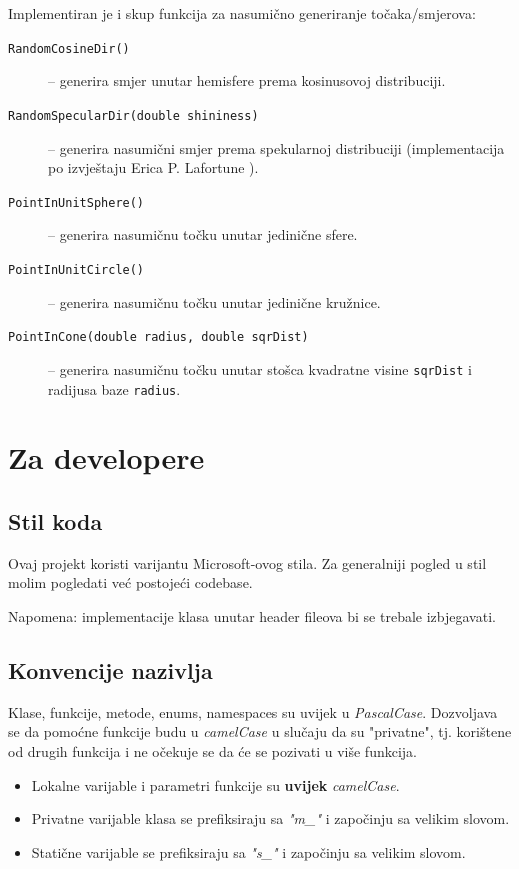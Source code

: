 \documentclass[
12pt, %
oneside, %
english, %
singlespacing, %
parskip, %
headsepline, %
chapterinoneline, %
consistentlayout, %
]{MastersDoctoralThesis} %
\begin{document}
Implementiran je i skup funkcija za nasumično generiranje točaka/smjerova:
\begin{description}
	\item[\texttt{RandomCosineDir()}] -- generira smjer unutar hemisfere prema 
		kosinusovoj distribuciji.
	\item[\texttt{RandomSpecularDir(double shininess)}] -- generira nasumični smjer prema
		spekularnoj distribuciji (implementacija po izvještaju Erica P. Lafortune \cite{lafortune}).
	\item[\texttt{PointInUnitSphere()}] -- generira nasumičnu točku unutar jedinične sfere.
	\item[\texttt{PointInUnitCircle()}]  -- generira nasumičnu točku unutar jedinične kružnice.
	\item[\texttt{PointInCone(double radius, double sqrDist)}] -- generira nasumičnu točku
		unutar stošca kvadratne visine \texttt{sqrDist} i radijusa baze \texttt{radius}.
\end{description}

{\let\clearpage\relax \chapter{Za developere}}

\section{Stil koda}
Ovaj projekt koristi varijantu Microsoft-ovog stila. Za generalniji pogled u stil molim pogledati
već postojeći codebase.

Napomena: implementacije klasa unutar header fileova bi se trebale izbjegavati.

\section{Konvencije nazivlja}
Klase, funkcije, metode, enums, namespaces su uvijek u \emph{PascalCase}.
Dozvoljava se da pomoćne funkcije budu u \emph{camelCase} u slučaju da su "privatne", tj.
korištene od drugih funkcija i ne očekuje se da će se pozivati u više funkcija.

\begin{itemize}
	\item Lokalne varijable i parametri funkcije su \textbf{uvijek} \emph{camelCase}.
	\item Privatne varijable klasa se prefiksiraju sa \emph{"m\_"} i započinju sa velikim slovom.
	\item Statične varijable se prefiksiraju sa \emph{"s\_"} i započinju sa velikim slovom.
\end{itemize}
\end{document}
